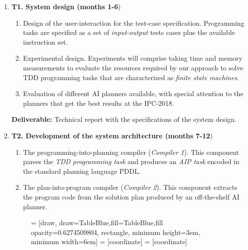 \documentclass[10pt,a4paper]{paper}
\begin{document}
\begin{enumerate}
\item {\bf T1. System design (months 1-6})
  \begin{small}
    \begin{enumerate}
    \item Design of the user-interaction for the test-case specification. Programming tasks are specified as a set of {\em input-output} tests cases plus the available instruction set. 
    \item Experimental design. Experiments will comprise taking time and memory measurements to evaluate the resources required by our approach to solve TDD programming tasks that are characterized as {\em finite state machines}.
      \item Evaluation of different AI planners available, with special attention to the planners that get the best results at the IPC-2018. 
      \end{enumerate}
  \end{small}

{\small {\bf Deliverable:} Technical report with the specifications of the system design.}
  
  \item {\bf T2. Development of the system architecture (months 7-12})
    \begin{small}
      \begin{enumerate}
      \item The programming-into-planning compiler ({\em Compiler 1}). This component parses the {\em TDD programming task} and produces an {\em AIP task} encoded in the standard planning language PDDL.
      \item The plan-into-program compiler ({\em Compiler 2}). This component extracts the program code from the solution plan produced by an off-the-shelf AI planner.
      \end{enumerate}
\end{small}      


\begin{figure}[hbt!]
 = [draw, draw=TableBlue,fill=TableBlue,fill opacity=0.6274509804, rectangle, minimum height=3em, minimum width=6em]
 = [coordinate]
 = [coordinate]
\begin{center}
\end{center}
\end{figure}
\end{enumerate}
\end{document}

